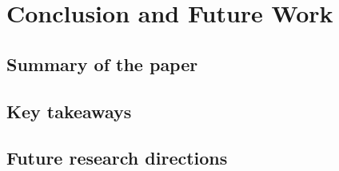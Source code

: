 \chapter{Conclusion and Future Work}

\section{Summary of the paper}
\section{Key takeaways}
\section{Future research directions}
